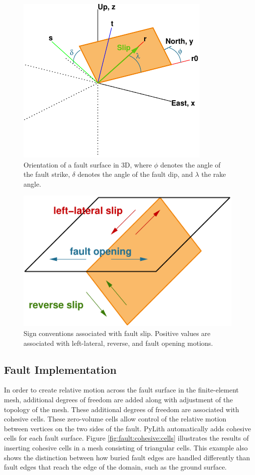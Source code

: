 \begin{figure}[htbp]
  \includegraphics{boundaryconditions/figs/faultOrientation}
  \caption{Orientation of a fault surface in 3D, where $\phi$ denotes the angle
    of the fault strike, $\delta$ denotes the angle of the fault dip,
    and $\lambda$ the rake angle.}
  \label{fig:fault:orientation} 
\end{figure}

\begin{figure}[htbp]
  \includegraphics{boundaryconditions/figs/slipmotions}
  \caption{Sign conventions associated with fault slip. Positive values are associated
    with left-lateral, reverse, and fault opening motions.}
  \label{fig:fault:slip:motions} 
\end{figure}

\subsection{Fault Implementation}

In order to create relative motion across the fault surface in the
finite-element mesh, additional degrees of freedom are added along
with adjustment of the topology of the mesh. These additional degrees
of freedom are associated with cohesive cells. These zero-volume cells
allow control of the relative motion between vertices on the two sides
of the fault. PyLith automatically adds cohesive cells for each fault
surface. Figure \vref{fig:fault:cohesive:cells} illustrates the results
of inserting cohesive cells in a mesh consisting of triangular cells.
This example also shows the distinction between how buried fault edges
are handled differently than fault edges that reach the edge of the
domain, such as the ground surface.

